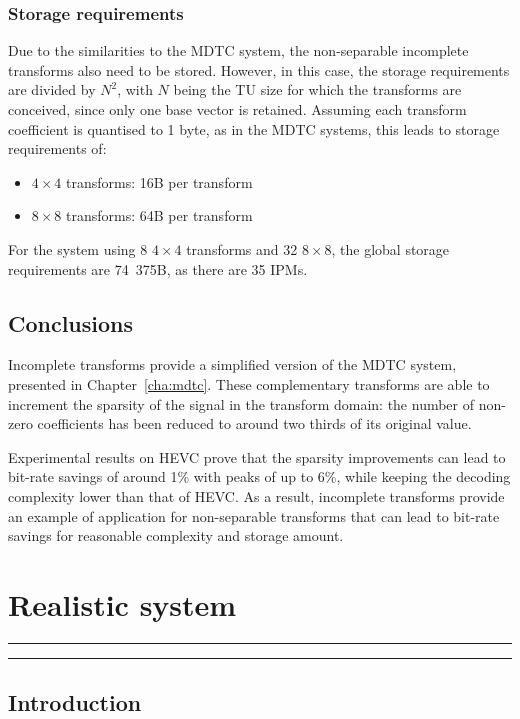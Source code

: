 \documentclass[11pt,a4paper,openright,twoside]{book}
\providecommand{\chaptertoc}{
	\startcontents[chapters]
	\hrule
	\vspace{1em}
	\printcontents[chapters]{}{1}{{\bf\large Contents}}
	\hrule
}
\numberwithin{equation}{section} %
\numberwithin{figure}{section} %
\numberwithin{table}{section} %
\begin{document}
\subsection{Storage requirements}
\label{sub:it_storage_requirements}

Due to the similarities to the \ac{MDTC} system, the non-separable incomplete
transforms also need to be stored.
However, in this case, the storage requirements are divided by $N^2$, with $N$
being the \ac{TU} size for which the transforms are conceived, since only one
base vector is retained.
Assuming each transform coefficient is quantised to 1 byte, as in the
\ac{MDTC} systems, this leads to storage requirements of:
\begin{itemize}
	\item $4\times4$ transforms: \unit{16}{B} per transform
	\item $8\times8$ transforms: \unit{64}{B} per transform
\end{itemize}
For the system using 8 $4\times4$ transforms and 32 $8\times8$, the global
storage requirements are \unit{74.375}{\kilo B}, as there are 35 \acp{IPM}.

\section{Conclusions}
\label{sec:it_conclusions}

Incomplete transforms provide a simplified version of the \ac{MDTC} system,
presented in Chapter~\ref{cha:mdtc}.
These complementary transforms are able to increment the sparsity of the
signal in the transform domain:
the number of non-zero coefficients has been reduced to around two thirds of
its original value.

Experimental results on \ac{HEVC} prove that the sparsity improvements can
lead to bit-rate savings of around 1\% with peaks of up to 6\%, while keeping
the decoding complexity lower than that of \ac{HEVC}.
As a result, incomplete transforms provide an example of application for
non-separable transforms that can lead to bit-rate savings for reasonable
complexity and storage amount.

\chapter{Realistic system}
\label{cha:realistic_system}
\chaptertoc

\section{Introduction}
\label{sec:rw_introduction}
\end{document}
